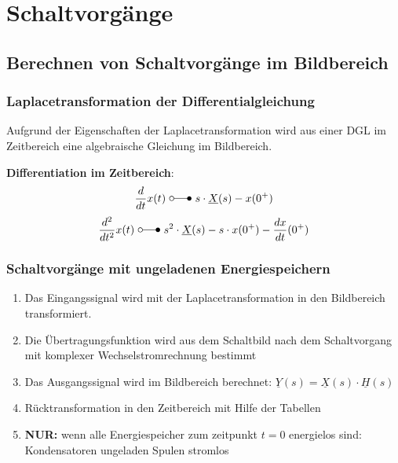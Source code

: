 \section{Schaltvorgänge}
\subsection{Berechnen von Schaltvorgänge im Bildbereich}
\subsubsection{Laplacetransformation der Differentialgleichung}
Aufgrund der Eigenschaften der Laplacetransformation wird aus einer
DGL im Zeitbereich eine algebraische Gleichung im Bildbereich.

\textbf{Differentiation im Zeitbereich}:
\[
	\frac{d}{dt}x(t) \ \laplace\ s\cdot\underline{X}(s)-x(0^+)
\]
\[
	\frac{d^2}{dt^2}x(t) \ \laplace\ s^2\cdot\underline{X}(s)-s\cdot x(0^+)-\frac{dx}{dt}(0^+)
\]


\subsubsection{Schaltvorgänge mit ungeladenen Energiespeichern}
\begin{enumerate}
	\item Das Eingangssignal wird mit der Laplacetransformation in den
	      Bildbereich transformiert.
    \item Die Übertragungsfunktion wird aus dem Schaltbild nach dem
        Schaltvorgang mit komplexer Wechselstromrechnung bestimmt
    \item Das Ausgangssignal wird im Bildbereich berechnet: $\underline{Y}(s) =
        \underline{X}(s)\cdot \underline{H}(s)$
    \item Rücktransformation in den Zeitbereich mit Hilfe der Tabellen
    \item \textbf{NUR:} wenn alle Energiespeicher zum zeitpunkt $t=0$
        energielos sind:
        \subitem[i] Kondensatoren ungeladen
        \subitem[ii] Spulen stromlos
\end{enumerate}
